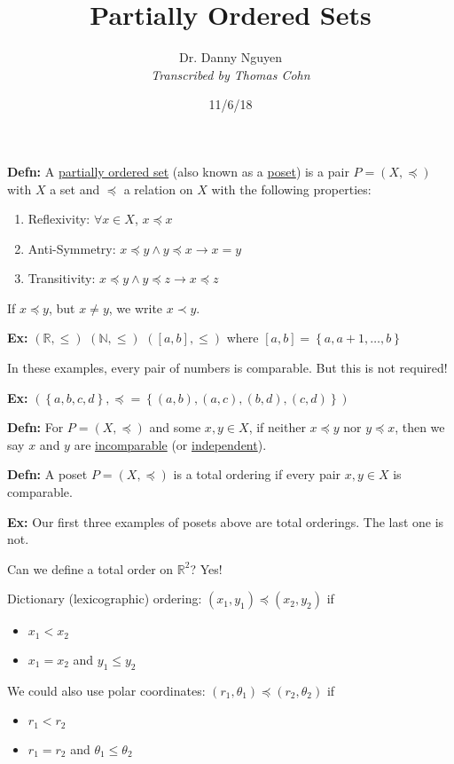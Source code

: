 \documentclass[10pt,letterpaper]{article}
\author{Dr. Danny Nguyen\\ \small\textit{Transcribed by Thomas Cohn}}
\title{Partially Ordered Sets}
\date{11/6/18} %
\newcommand{\n}{\hfill\break}
\newcommand{\defn}[1]{\par\noindent\settowidth{\hangindent}{\textbf{Defn: }}\textbf{Defn: }#1\n}
\newcommand{\ex}[1]{\par\noindent\settowidth{\hangindent}{\textbf{Ex: }}\textbf{Ex: }#1\n}
\newcommand{\set}[1]{\left\{#1\right\}}
\newcommand{\naturals}{\mathbb{N}}
\newcommand{\N}{\naturals}
\newcommand{\reals}{\mathbb{R}}
\newcommand{\R}{\reals}
\begin{document}
\maketitle
\setlength\RaggedRightParindent{\parindent}
\RaggedRight

\defn{A \underline{partially ordered set} (also known as a \underline{poset}) is a pair $P=(X,\preceq)$ with $X$ a set and $\preceq$ a relation on $X$ with the following properties:
\begin{enumerate}
	\item Reflexivity: $\forall{}x\in{}X$, $x\preceq{}x$
	\item Anti-Symmetry: $x\preceq{}y\land{}y\preceq{}x\to{}x=y$
	\item Transitivity: $x\preceq{}y\land{}y\preceq{}z\to{}x\preceq{}z$
\end{enumerate}
If $x\preceq{}y$, but $x\ne{}y$, we write $x\prec{}y$.}

\ex{$(\R,\le)$\n
$(\N,\le)$\n
$([a,b],\le)$ where $[a,b]=\set{a,a+1,\ldots,b}$}

\par\noindent In these examples, every pair of numbers is comparable. But this is not required!\n

\ex{$(\set{a,b,c,d},\preceq=\set{(a,b),(a,c),(b,d),(c,d)})$}

\defn{For $P=(X,\preceq)$ and some $x,y\in{}X$, if neither $x\preceq{}y$ nor $y\preceq{}x$, then we say $x$ and $y$ are \underline{incomparable} (or \underline{independent}).}

\defn{A poset $P=(X,\preceq)$ is a total ordering if every pair $x,y\in{}X$ is comparable.}

\ex{Our first three examples of posets above are total orderings. The last one is not.}

\par\noindent Can we define a total order on $\R^{2}$? Yes!

\par\noindent Dictionary (lexicographic) ordering:\n
$(x_{1},y_{1})\preceq(x_{2},y_{2})$ if
\begin{itemize}
	\item $x_{1}<x_{2}$
	\item $x_{1}=x_{2}$ and $y_{1}\le{}y_{2}$
\end{itemize}

\par\noindent We could also use polar coordinates:\n
$(r_{1},\theta_{1})\preceq(r_{2},\theta_{2})$ if
\begin{itemize}
	\item $r_{1}<r_{2}$
	\item $r_{1}=r_{2}$ and $\theta_{1}\le\theta_{2}$
\end{itemize}
\end{document}
